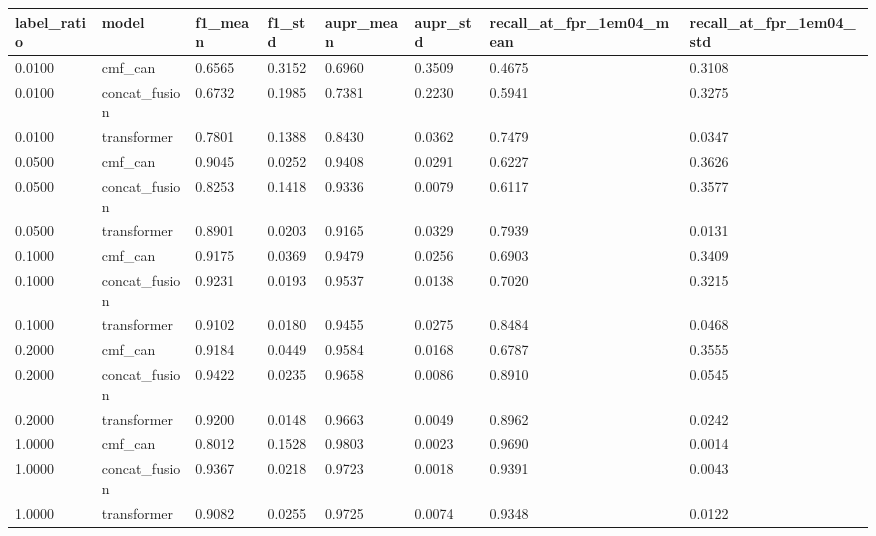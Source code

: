 \begin{tabular}{llllllll}
\toprule
label\_ratio & model & f1\_mean & f1\_std & aupr\_mean & aupr\_std & recall\_at\_fpr\_1em04\_mean & recall\_at\_fpr\_1em04\_std \\
\midrule
0.0100 & cmf\_can & 0.6565 & 0.3152 & 0.6960 & 0.3509 & 0.4675 & 0.3108 \\
0.0100 & concat\_fusion & 0.6732 & 0.1985 & 0.7381 & 0.2230 & 0.5941 & 0.3275 \\
0.0100 & transformer & 0.7801 & 0.1388 & 0.8430 & 0.0362 & 0.7479 & 0.0347 \\
0.0500 & cmf\_can & 0.9045 & 0.0252 & 0.9408 & 0.0291 & 0.6227 & 0.3626 \\
0.0500 & concat\_fusion & 0.8253 & 0.1418 & 0.9336 & 0.0079 & 0.6117 & 0.3577 \\
0.0500 & transformer & 0.8901 & 0.0203 & 0.9165 & 0.0329 & 0.7939 & 0.0131 \\
0.1000 & cmf\_can & 0.9175 & 0.0369 & 0.9479 & 0.0256 & 0.6903 & 0.3409 \\
0.1000 & concat\_fusion & 0.9231 & 0.0193 & 0.9537 & 0.0138 & 0.7020 & 0.3215 \\
0.1000 & transformer & 0.9102 & 0.0180 & 0.9455 & 0.0275 & 0.8484 & 0.0468 \\
0.2000 & cmf\_can & 0.9184 & 0.0449 & 0.9584 & 0.0168 & 0.6787 & 0.3555 \\
0.2000 & concat\_fusion & 0.9422 & 0.0235 & 0.9658 & 0.0086 & 0.8910 & 0.0545 \\
0.2000 & transformer & 0.9200 & 0.0148 & 0.9663 & 0.0049 & 0.8962 & 0.0242 \\
1.0000 & cmf\_can & 0.8012 & 0.1528 & 0.9803 & 0.0023 & 0.9690 & 0.0014 \\
1.0000 & concat\_fusion & 0.9367 & 0.0218 & 0.9723 & 0.0018 & 0.9391 & 0.0043 \\
1.0000 & transformer & 0.9082 & 0.0255 & 0.9725 & 0.0074 & 0.9348 & 0.0122 \\
\bottomrule
\end{tabular}

